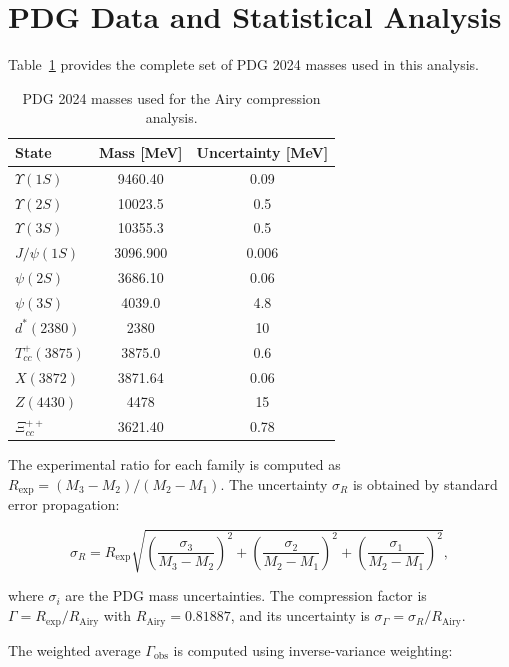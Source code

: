 \documentclass[12pt,a4paper]{article}
\theoremstyle{plain}
\theoremstyle{definition}
\theoremstyle{remark}
\begin{document}
\appendix
\section{PDG Data and Statistical Analysis}
\label{app:data}

Table~\ref{tab:pdg_full} provides the complete set of PDG 2024 masses used in this analysis.

\begin{table}[H]
\centering
\caption{PDG 2024 masses used for the Airy compression analysis.}
\label{tab:pdg_full}
\begin{tabular}{lcc}
\toprule
State & Mass [MeV] & Uncertainty [MeV] \\
\midrule
\(\Upsilon(1S)\) & 9460.40 & 0.09 \\
\(\Upsilon(2S)\) & 10023.5 & 0.5 \\
\(\Upsilon(3S)\) & 10355.3 & 0.5 \\
\(J/\psi(1S)\) & 3096.900 & 0.006 \\
\(\psi(2S)\) & 3686.10 & 0.06 \\
\(\psi(3S)\) & 4039.0 & 4.8 \\
\(d^*(2380)\) & 2380 & 10 \\
\(T_{cc}^+(3875)\) & 3875.0 & 0.6 \\
\(X(3872)\) & 3871.64 & 0.06 \\
\(Z(4430)\) & 4478 & 15 \\
\(\Xi_{cc}^{++}\) & 3621.40 & 0.78 \\
\bottomrule
\end{tabular}
\end{table}

The experimental ratio for each family is computed as \(R_{\text{exp}} = (M_3 - M_2)/(M_2 - M_1)\). The uncertainty \(\sigma_R\) is obtained by standard error propagation:

\begin{equation}
\sigma_R = R_{\text{exp}} \sqrt{\left(\frac{\sigma_3}{M_3-M_2}\right)^2 + \left(\frac{\sigma_2}{M_2-M_1}\right)^2 + \left(\frac{\sigma_1}{M_2-M_1}\right)^2},
\label{eq:sigmaR}
\end{equation}

where \(\sigma_i\) are the PDG mass uncertainties. The compression factor is \(\Gamma = R_{\text{exp}}/R_{\text{Airy}}\) with \(R_{\text{Airy}} = 0.81887\), and its uncertainty is \(\sigma_\Gamma = \sigma_R/R_{\text{Airy}}\).

The weighted average \(\Gamma_{\text{obs}}\) is computed using inverse-variance weighting:
\end{document}
